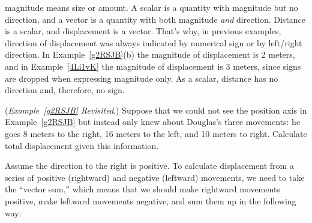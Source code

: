 \documentclass[../main.tex]{subfiles}
\begin{document}
\vspace{1em}

\Gls{magnitude} means size or amount. A \gls{scalar} is a quantity with magnitude but no direction, and a \gls{vector} is a quantity with both magnitude \textit{and} direction. Distance is a scalar, and displacement is a vector. That's why, in previous examples, direction of displacement was always indicated by numerical sign or by left/right direction. In Example~\ref{g2RSJB}(b) the magnitude of displacement is 2 meters, and in Example~\ref{4Li1vK} the magnitude of displacement is 3 meters, since signs are dropped when expressing magnitude only. As a scalar, distance has no direction and, therefore, no sign.

\vspace{1em}

\begin{example} \label{LBLwIS}
    (\textit{Example~\ref{g2RSJB} Revisited}.) Suppose that we could not see the position axis in Example~\ref{g2RSJB} but instead only knew about Douglas's three movements: he goes 8 meters to the right, 16 meters to the left, and 10 meters to right. Calculate total displacement given this information.
\end{example}

\begin{center}
\end{center}

\Solution Assume the direction to the right is positive. To calculate displacement from a series of positive (rightward) and negative (leftward) movements, we need to take the ``vector sum,'' which means that we should make rightward movements positive, make leftward movements negative, and sum them up in the following way:
\end{document}
